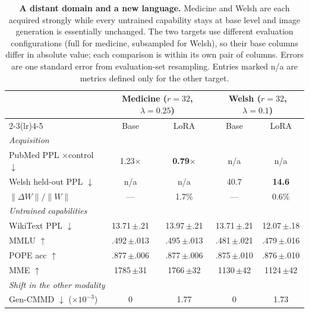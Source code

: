 \documentclass{article}
\begin{document}
\begin{table}[t]
\caption{\textbf{A distant domain and a new language.} Medicine and Welsh are
each acquired strongly while every untrained capability stays at base level and
image generation is essentially unchanged. The two targets use different
evaluation configurations (full for medicine, subsampled for Welsh), so their
base columns differ in absolute value; each comparison is within its own pair of
columns. Errors are one standard error from evaluation-set resampling. Entries
marked n/a are metrics defined only for the other target.}
\label{tab:targets}
\centering\small
\setlength{\tabcolsep}{5pt}
\begin{tabular}{lcccc}
\toprule
& \multicolumn{2}{c}{Medicine ($r{=}32$, $\lambda{=}0.25$)}
& \multicolumn{2}{c}{Welsh ($r{=}32$, $\lambda{=}0.1$)} \\
\cmidrule(lr){2-3}\cmidrule(lr){4-5}
& Base & LoRA & Base & LoRA \\
\midrule
\multicolumn{5}{l}{\emph{Acquisition}}\\
PubMed PPL $\times$control $\downarrow$ & 1.23$\times$ & \textbf{0.79$\times$} & n/a & n/a \\
Welsh held-out PPL $\downarrow$         & n/a & n/a & 40.7 & \textbf{14.6} \\
$\lVert\Delta W\rVert/\lVert W\rVert$   & --- & 1.7\% & --- & 0.6\% \\
\midrule
\multicolumn{5}{l}{\emph{Untrained capabilities}}\\
WikiText PPL $\downarrow$ & 13.71\,$\pm$.21 & 13.97\,$\pm$.21 & 13.71\,$\pm$.21 & 12.07\,$\pm$.18 \\
MMLU $\uparrow$           & .492\,$\pm$.013 & .495\,$\pm$.013 & .481\,$\pm$.021 & .479\,$\pm$.016 \\
POPE acc $\uparrow$       & .877\,$\pm$.006 & .877\,$\pm$.006 & .875\,$\pm$.010 & .876\,$\pm$.010 \\
MME $\uparrow$            & 1785\,$\pm$31   & 1766\,$\pm$32   & 1130\,$\pm$42   & 1124\,$\pm$42 \\
\midrule
\multicolumn{5}{l}{\emph{Shift in the other modality}}\\
Gen-CMMD $\downarrow$ ($\times10^{-3}$) & 0 & 1.77 & 0 & 1.73 \\
\bottomrule
\end{tabular}
\end{table}
\end{document}
